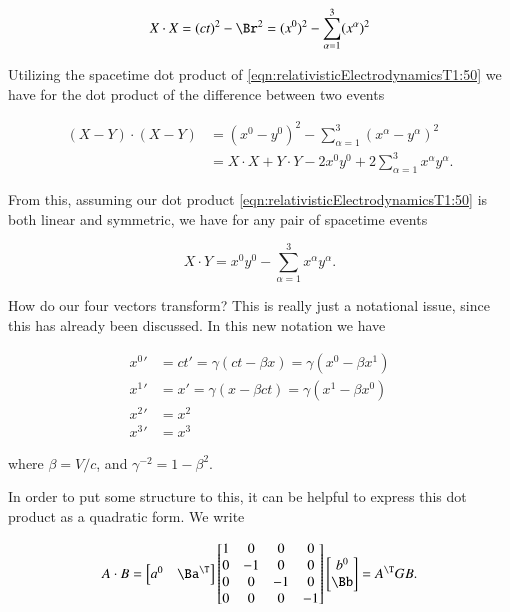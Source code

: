 \begin{equation}\label{eqn:relativisticElectrodynamicsT1:50}
X \cdot X = (ct)^2 - \Br^2 = (x^0)^2 - \sum_{\alpha=1}^3 (x^\alpha)^2
\end{equation}

Utilizing the spacetime dot product of \ref{eqn:relativisticElectrodynamicsT1:50} we have for the dot product of the difference between two events

\begin{align*}
(X - Y) \cdot (X - Y)
&=
(x^0 - y^0)^2 - \sum_{\alpha =1}^3 (x^\alpha - y^\alpha)^2 \\
&=
X \cdot X + Y \cdot Y - 2 x^0 y^0 + 2 \sum_{\alpha =1}^3 x^\alpha y^\alpha.
\end{align*}

From this, assuming our dot product \ref{eqn:relativisticElectrodynamicsT1:50} is both linear and symmetric, we have for any pair of spacetime events

\begin{equation}\label{eqn:relativisticElectrodynamicsT1:55}
X \cdot Y = x^0 y^0 - \sum_{\alpha =1}^3 x^\alpha y^\alpha.
\end{equation}

How do our four vectors transform?  This is really just a notational issue, since this has already been discussed.  In this new notation we have

\begin{align}\label{eqn:relativisticElectrodynamicsT1:90}
{x^0}' &= ct' = \gamma ( ct - \beta x) = \gamma ( x^0 - \beta x^1 ) \\
{x^1}' &= x' = \gamma ( x - \beta ct ) = \gamma ( x^1 - \beta x^0 ) \\
{x^2}' &= x^2 \\
{x^3}' &= x^3
\end{align}

where $\beta = V/c$, and $\gamma^{-2} = 1 - \beta^2$.

In order to put some structure to this, it can be helpful to express this dot product as a quadratic form.  We write

\begin{align}\label{eqn:relativisticElectrodynamicsT1:100}
A \cdot B = 
\begin{bmatrix}
a^0 & \Ba^\T 
\end{bmatrix}
\begin{bmatrix}
1 & 0 & 0 & 0 \\
0 & -1 & 0 & 0 \\
0 & 0 & -1 & 0 \\
0 & 0 & 0 & -1 
\end{bmatrix}
\begin{bmatrix}
b^0 \\
\Bb
\end{bmatrix}
= A^\T G B.
\end{align}

